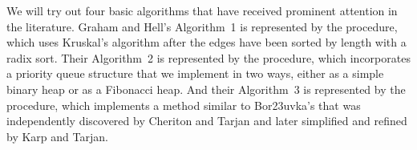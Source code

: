 We will try out four basic algorithms that have received prominent
attention in the literature. Graham and Hell's Algorithm~1 is represented
by the  procedure, which uses Kruskal's algorithm after the
edges have been sorted by length with a radix sort. Their Algorithm~2
is represented by the  procedure, which incorporates a
priority queue structure that we implement in two ways, either as
a simple binary heap or as a Fibonacci heap. And their Algorithm~3
is represented by the  procedure, which implements a
method similar to Bor{\accent23u}vka's that was independently
discovered by Cheriton and Tarjan and later simplified and refined by
Karp and Tarjan.

